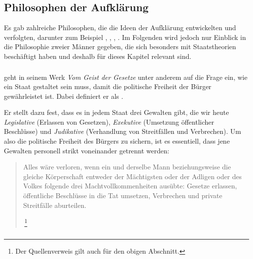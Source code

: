 
\subsection{Philosophen der Aufklärung}

Es gab zahlreiche Philosophen, die die Ideen der Aufklärung
entwickelten und verfolgten, darunter zum Beispiel , , , .
Im Folgenden wird jedoch nur Einblick in die Philosophie zweier Männer
gegeben, die sich besonders mit Staatstheorien beschäftigt haben und
deshalb für dieses Kapitel relevant sind.


\subsubsection{}

 geht in seinem Werk \emph{Vom Geist der
Gesetze} unter anderem auf die Frage ein, wie
ein Staat gestaltet sein muss, damit die politische Freiheit der
Bürger gewährleistet ist. Dabei definiert er 
als .

Er stellt dazu fest, dass es in jedem Staat drei Gewalten gibt, die
wir heute \emph{Legislative} (Erlassen von Gesetzen), \emph{Exekutive}
(Umsetzung öffentlicher Beschlüsse) und \emph{Judikative}
(Verhandlung von Streitfällen und Verbrechen). Um also die politische
Freiheit des Bürgers zu sichern, ist es essentiell, dass jene Gewalten
personell strikt voneinander getrennt werden:

\blockquote[{\,\footnote{Der
Quellenverweis gilt auch für den obigen Abschnitt.} }]{Alles wäre
verloren, wenn ein und derselbe Mann beziehungsweise die gleiche
Körperschaft entweder der Mächtigsten oder der Adligen oder des Volkes
folgende drei Machtvollkommenheiten ausübte: Gesetze erlassen,
öffentliche Beschlüsse in die Tat umsetzen, Verbrechen und private
Streitfälle aburteilen.}


\subsubsection{}


